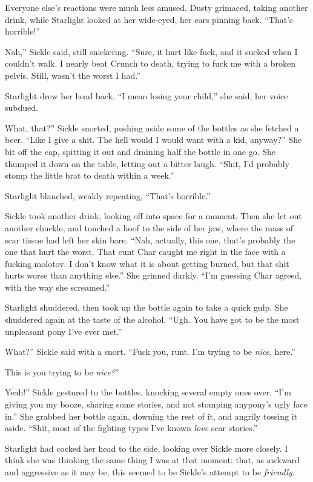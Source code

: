 Everyone else’s reactions were much less amused. Dusty grimaced, taking another drink, while Starlight looked at her wide-eyed, her ears pinning back. “That’s horrible!”

\leavevmode{}Nah,” Sickle said, still snickering. “Sure, it hurt like fuck, and it sucked when I couldn’t walk. I nearly beat Crunch to death, trying to fuck me with a broken pelvis. Still, wasn’t the worst I had.”

Starlight drew her head back. “I mean losing your child,” she said, her voice subdued.

\leavevmode{}What, that?” Sickle snorted, pushing aside some of the bottles as she fetched a beer. “Like I give a shit. The hell would I would want with a kid, anyway?” She bit off the cap, spitting it out and draining half the bottle in one go. She thumped it down on the table, letting out a bitter laugh. “Shit, I’d probably stomp the little brat to death within a week.”

Starlight blanched, weakly repeating, “That’s horrible.”

Sickle took another drink, looking off into space for a moment. Then she let out another chuckle, and touched a hoof to the side of her jaw, where the mass of scar tissue had left her skin bare. “Nah, actually, this one, that’s probably the one that hurt the worst. That cunt Char caught me right in the face with a fucking molotov. I don’t know what it is about getting burned, but that shit hurts worse than anything else.” She grinned darkly. “I’m guessing Char agreed, with the way she screamed.”

Starlight shuddered, then took up the bottle again to take a quick gulp. She shuddered again at the taste of the alcohol. “Ugh. You have got to be the most unpleasant pony I’ve ever met.”

\leavevmode{}What?” Sickle said with a snort. “Fuck you, runt. I’m trying to be \textit{nice}, here.”

\leavevmode{}This is you trying to be \textit{nice?}”

\leavevmode{}Yeah!” Sickle gestured to the bottles, knocking several empty ones over. “I’m giving you my booze, sharing some stories, and not stomping anypony’s ugly face in.” She grabbed her bottle again, downing the rest of it, and angrily tossing it aside. “Shit, most of the fighting types I’ve known \textit{love} scar stories.”

Starlight had cocked her head to the side, looking over Sickle more closely. I think she was thinking the same thing I was at that moment: that, as awkward and aggressive as it may be, this seemed to be Sickle’s attempt to be \textit{friendly}.

